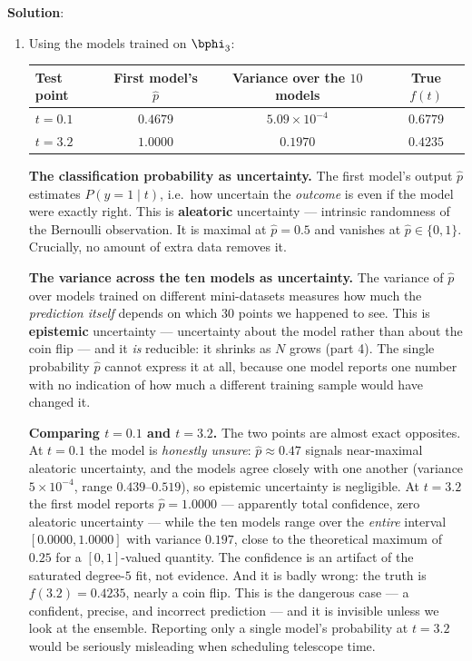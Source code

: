 \documentclass[submit]{../harvardml}
\newenvironment{solution}{
    \vspace{2mm}
    \color{blue}\noindent\textbf{Solution}:
}{}
\begin{document}
\begin{solution}
\begin{enumerate}
\item
Using the models trained on $\bphi_3$:
\begin{center}
\begin{tabular}{lccc}
  \hline
  Test point & First model's $\hat p$ & Variance over the $10$ models & True $f(t)$ \\
  \hline
  $t = 0.1$ & $0.4679$ & $5.09\times10^{-4}$ & $0.6779$ \\
  $t = 3.2$ & $1.0000$ & $0.1970$            & $0.4235$ \\
  \hline
\end{tabular}
\end{center}

\noindent \textbf{The classification probability as uncertainty.} The first model's
output $\hat p$ estimates $P(y = 1 \mid t)$, i.e.\ how uncertain the \emph{outcome}
is even if the model were exactly right. This is \textbf{aleatoric} uncertainty ---
intrinsic randomness of the Bernoulli observation. It is maximal at $\hat p = 0.5$
and vanishes at $\hat p \in \{0,1\}$. Crucially, no amount of extra data removes it.

\noindent \textbf{The variance across the ten models as uncertainty.} The variance of
$\hat p$ over models trained on different mini-datasets measures how much the
\emph{prediction itself} depends on which $30$ points we happened to see. This is
\textbf{epistemic} uncertainty --- uncertainty about the model rather than about the
coin flip --- and it \emph{is} reducible: it shrinks as $N$ grows (part 4). The
single probability $\hat p$ cannot express it at all, because one model reports one
number with no indication of how much a different training sample would have changed it.

\noindent \textbf{Comparing $t=0.1$ and $t=3.2$.} The two points are almost exact
opposites. At $t = 0.1$ the model is \emph{honestly unsure}: $\hat p \approx 0.47$
signals near-maximal aleatoric uncertainty, and the models agree closely with one
another (variance $5\times10^{-4}$, range $0.439$--$0.519$), so epistemic uncertainty
is negligible. At $t = 3.2$ the first model reports $\hat p = 1.0000$ --- apparently
total confidence, zero aleatoric uncertainty --- while the ten models range over the
\emph{entire} interval $[0.0000, 1.0000]$ with variance $0.197$, close to the
theoretical maximum of $0.25$ for a $[0,1]$-valued quantity. The confidence is an
artifact of the saturated degree-$5$ fit, not evidence. And it is badly wrong: the
truth is $f(3.2) = 0.4235$, nearly a coin flip. This is the dangerous case --- a
confident, precise, and incorrect prediction --- and it is invisible unless we look at
the ensemble. Reporting only a single model's probability at $t=3.2$ would be
seriously misleading when scheduling telescope time.


\end{enumerate}
\end{solution}
\end{document}
